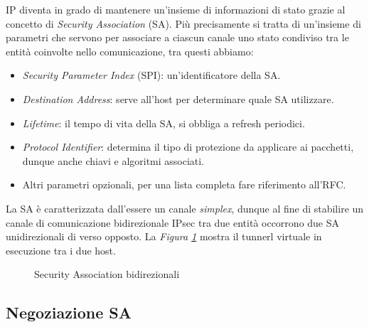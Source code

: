 \noindent 
IP diventa in grado di mantenere un'insieme di informazioni di stato grazie al concetto di \textit{Security Association} (SA).
Più precisamente si tratta di un'insieme di parametri che servono per associare a ciascun canale uno stato condiviso tra le entità coinvolte nello comunicazione,
tra questi abbiamo:

\begin{itemize}
    \item \textit{Security Parameter Index} (SPI): un'identificatore della SA.
    \item \textit{Destination Address}: serve all'host per determinare quale SA utilizzare. 
    \item \textit{Lifetime}: il tempo di vita della SA, si obbliga a refresh periodici.
    \item \textit{Protocol Identifier}: determina il tipo di protezione da applicare ai pacchetti, dunque anche chiavi e algoritmi associati.
    \item Altri parametri opzionali, per una lista completa fare riferimento all'RFC.
\end{itemize}

\noindent
La SA è caratterizzata dall'essere un canale \textit{simplex}, dunque al fine di stabilire un canale di comunicazione bidirezionale IPsec tra due entità occorrono due SA unidirezionali di verso opposto.
La \textit{Figura \ref{fig:sa_bidirezionale}} mostra il tunnerl virtuale in esecuzione tra i due host.
\begin{figure}[h!]
    \centering
    \vspace{0.4cm}
    \caption{Security Association bidirezionali}
    \label{fig:sa_bidirezionale}
\end{figure}

\noindent

\subsection{Negoziazione SA}

